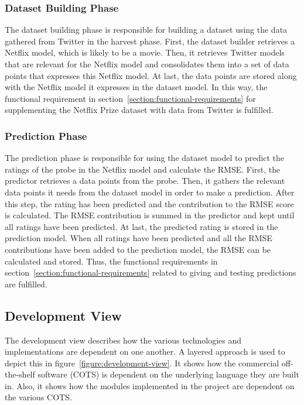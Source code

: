 \subsubsection{Dataset Building Phase}
The dataset building phase is responsible for building a dataset using the data gathered from Twitter in the harvest phase. First, the dataset builder retrieves a Netflix model, which is likely to be a movie. Then, it retrieves Twitter models that are relevant for the Netflix model and consolidates them into a set of data points that expresses this Netflix model. At last, the data points are stored along with the Netflix model it expresses in the dataset model. In this way, the functional requirement in section~\ref{section:functional-requirements} for supplementing the Netflix Prize dataset with data from Twitter is fulfilled.


\subsubsection{Prediction Phase}\label{subsubsec:predict-phase}
The prediction phase is responsible for using the dataset model to predict the ratings of the probe in the Netflix model and calculate the RMSE. First, the predictor retrieves a data points from the probe. Then, it gathers the relevant data points it needs from the dataset model in order to make a prediction. After this step, the rating has been predicted and the contribution to the RMSE score is calculated. The RMSE contribution is summed in the predictor and kept until all ratings have been predicted. At last, the predicted rating is stored in the prediction model. When all ratings have been predicted and all the RMSE contributions have been added to the prediction model, the RMSE can be calculated and stored. Thus, the functional requirements in section~\ref{section:functional-requirements} related to giving and testing predictions are fulfilled.

\subsection{Development View}
The development view describes how the various technologies and implementations are dependent on one another. A layered approach is used to depict this in figure~\ref{figure:development-view}. It shows how the commercial off-the-shelf software (COTS) is dependent on the underlying language they are built in. Also, it shows how the modules implemented in the project are dependent on the various COTS.

